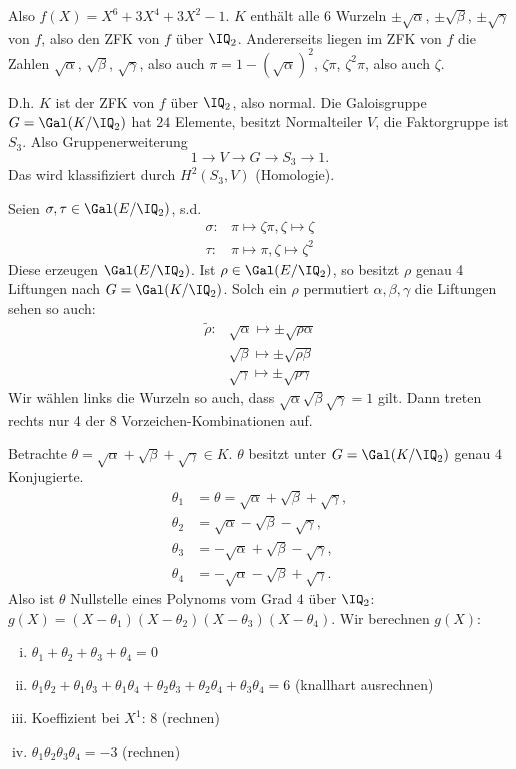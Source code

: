\begin{Beispiel}
\begin{enumerate}[1)]
  Also $f(X)=X^6+3X^4+3X^2-1$. $K$ enthält alle 6 Wurzeln $\pm \sqrt\alpha$, $\pm \sqrt\beta$, $\pm \sqrt\gamma$ von $f$, also den ZFK von $f$ über $\IQ_2$. Andererseits liegen im ZFK von $f$ die Zahlen $\sqrt{\alpha}$, $\sqrt{\beta}$, $\sqrt{\gamma}$, also auch $\pi=1-(\sqrt\alpha)^2$, $\zeta\pi$, $\zeta^2\pi$, also auch $\zeta$.
  
  D.h. $K$ ist der ZFK von $f$ über $\IQ_2$, also normal. Die Galoisgruppe $G=\Gal(K/\IQ_2)$ hat $24$ Elemente, besitzt Normalteiler $V$, die Faktorgruppe ist $S_3$. Also Gruppenerweiterung 
  \[1\rightarrow V\rightarrow G \rightarrow S_3 \rightarrow 1.\]
  Das wird klassifiziert durch $H^2(S_3,V)$ (Homologie).
  
  Seien $\sigma,\tau\in\Gal(E/\IQ_2)$, s.d.
  \begin{align*}
   \sigma:& \pi\mapsto \zeta\pi, \zeta\mapsto\zeta\\
   \tau: & \pi\mapsto \pi, \zeta\mapsto\zeta^2
  \end{align*}
  Diese erzeugen $\Gal(E/\IQ_2)$. Ist $\rho\in\Gal(E/\IQ_2)$, so besitzt $\rho$ genau 4 Liftungen nach $G=\Gal(K/\IQ_2)$. Solch ein $\rho$ permutiert $\alpha,\beta,\gamma$ die Liftungen sehen so auch:
  \begin{align*}
   \tilde\rho: & \sqrt{\alpha} \mapsto \pm\sqrt{\rho\alpha}\\
   &\sqrt{\beta} \mapsto \pm\sqrt{\rho\beta}\\
   &\sqrt{\gamma} \mapsto \pm\sqrt{\rho\gamma}
  \end{align*}
 Wir wählen links die Wurzeln so auch, dass $\sqrt\alpha\sqrt\beta\sqrt\gamma=1$ gilt. Dann treten rechts nur 4 der 8 Vorzeichen-Kombinationen auf.
 
 Betrachte $\theta=\sqrt\alpha+\sqrt{\beta}+\sqrt\gamma\in K$. $\theta$ besitzt unter $G=\Gal(K/\IQ_2)$ genau $4$ Konjugierte.
 \begin{align*}
  \theta_1&=\theta=\sqrt\alpha+\sqrt{\beta}+\sqrt{\gamma},\\
  \theta_2&=\sqrt\alpha-\sqrt{\beta}-\sqrt{\gamma},\\
  \theta_3&=-\sqrt\alpha+\sqrt{\beta}-\sqrt{\gamma},\\
  \theta_4&=-\sqrt\alpha-\sqrt{\beta}+\sqrt{\gamma}.
 \end{align*}
 Also ist $\theta$ Nullstelle eines Polynoms vom Grad $4$ über $\IQ_2$: $g(X)=(X-\theta_1)(X-\theta_2)(X-\theta_3)(X-\theta_4)$. Wir berechnen $g(X)$:
 \begin{enumerate}[i)]
  \item $\theta_1+\theta_2+\theta_3+\theta_4=0$
  \item $\theta_1\theta_2+\theta_1\theta_3+\theta_1\theta_4+\theta_2\theta_3+\theta_2\theta_4+\theta_3\theta_4=6$ (knallhart ausrechnen)
  \item Koeffizient bei $X^1$: $8$ (rechnen)
  \item $\theta_1\theta_2\theta_3\theta_4=-3$ (rechnen)
 \end{enumerate}


\end{enumerate}
\end{Beispiel}
